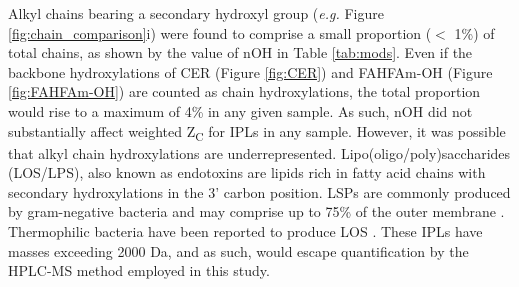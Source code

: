 Alkyl chains bearing a secondary hydroxyl group (\textit{e.g.} Figure \ref{fig:chain_comparison}i) were found to comprise a small proportion ($<$ 1\%) of total chains, as shown by the value of nOH in Table \ref{tab:mods}. Even if the backbone hydroxylations of CER (Figure \ref{fig:CER}) and FAHFAm-OH (Figure \ref{fig:FAHFAm-OH}) are counted as chain hydroxylations, the total proportion would rise to a maximum of 4\% in any given sample. As such, nOH did not substantially affect weighted Z\textsubscript{C} for IPLs in any sample. However, it was possible that alkyl chain hydroxylations are underrepresented. Lipo(oligo/poly)saccharides (LOS/LPS), also known as endotoxins are lipids rich in fatty acid chains with secondary hydroxylations in the 3' carbon position. LSPs are commonly produced by gram-negative bacteria and may comprise up to 75\% of the outer membrane \citep{silipo2010lipopolysaccharides}. Thermophilic bacteria have been reported to produce LOS \citep{di2014thermophiles}. These IPLs have masses exceeding 2000 Da, and as such, would escape quantification by the HPLC-MS method employed in this study.


